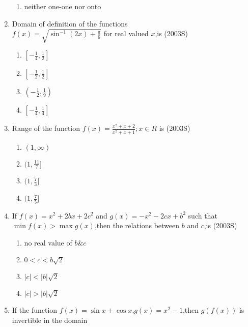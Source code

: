 \documentclass[journal,12pt,twocolumn]{IEEEtran}
\theoremstyle{remark}
\begin{document}
\begin{enumerate}
\begin{enumerate}
    \item neither one-one nor onto
\end{enumerate}
\item Domain of definition of the functions\\ $f(x)=\sqrt{\sin^{-1}(2x)+\frac{\pi}{6}}$ for real valued $x$,is
\hfill(2003S)\\
\begin{multicols}{2}
\begin{enumerate}
    \item$\left[-\frac{1}{4},\frac{1}{2}\right]$\\
    \item$\left[-\frac{1}{2},\frac{1}{2}\right]$\\
    \item$\left(-\frac{1}{2},\frac{1}{9}\right)$\\
    \item$\left[-\frac{1}{4},\frac{1}{4}\right]$
\end{enumerate}
\end{multicols}
\item Range of the function $f(x)=\frac{x^2+x+2}{x^2+x+1};x\in R$ is
\hfill(2003S)\\
\begin{multicols}{2}
\begin{enumerate}
    \item $(1,\infty)$
    \item $(1,\frac{11}{7}]$
    \item $(1,\frac{7}{3}]$
    \item $(1,\frac{7}{5}]$
\end{enumerate}
\end{multicols}
\item If $f(x)=x^2+2bx+2c^2$ and $g(x)=-x^2-2cx+b^2$ such that $\min f(x)>\max g(x)$,then the relations between $b$ and $c$,is
\hfill(2003S)\\
\begin{multicols}{2}
\begin{enumerate}
    \item no real value of $b\& c$
    \item $0<c<b\sqrt{2}$
    \item $|c|<|b|\sqrt{2}$
    \item $|c|>|b|\sqrt{2}$
\end{enumerate}
\end{multicols}
\item If the function $f(x)=\sin x+\cos x$,$g(x)=x^2-1$,then $g(f(x))$ is invertible in the domain 

\end{enumerate}
\end{document}
